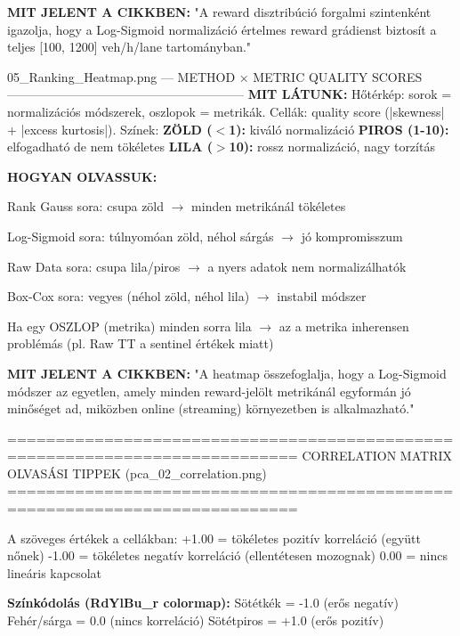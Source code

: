 \documentclass[11pt,a4paper]{article}
\begin{document}
\textbf{MIT JELENT A CIKKBEN:}
"A reward disztribúció forgalmi szintenként igazolja, hogy a
Log-Sigmoid normalizáció értelmes reward grádienst biztosít
a teljes [100, 1200] veh/h/lane tartományban."

05\_Ranking\_Heatmap.png — METHOD × METRIC QUALITY SCORES
---------------------------------------------------------
\textbf{MIT LÁTUNK:}
Hőtérkép: sorok = normalizációs módszerek, oszlopok = metrikák.
Cellák: quality score (|skewness| + |excess kurtosis|).
Színek:
\textbf{ZÖLD ($<$1):} kiváló normalizáció
\textbf{PIROS (1-10):} elfogadható de nem tökéletes
\textbf{LILA ($>$10):} rossz normalizáció, nagy torzítás

\textbf{HOGYAN OLVASSUK:}
\par\noindent\hspace*{1em}\textbullet{} Rank Gauss sora: csupa zöld $\rightarrow$ minden metrikánál tökéletes
\par\noindent\hspace*{1em}\textbullet{} Log-Sigmoid sora: túlnyomóan zöld, néhol sárgás $\rightarrow$ jó kompromisszum
\par\noindent\hspace*{1em}\textbullet{} Raw Data sora: csupa lila/piros $\rightarrow$ a nyers adatok nem normalizálhatók
\par\noindent\hspace*{1em}\textbullet{} Box-Cox sora: vegyes (néhol zöld, néhol lila) $\rightarrow$ instabil módszer
\par\noindent\hspace*{1em}\textbullet{} Ha egy OSZLOP (metrika) minden sorra lila $\rightarrow$ az a metrika
inherensen problémás (pl. Raw TT a sentinel értékek miatt)

\textbf{MIT JELENT A CIKKBEN:}
"A heatmap összefoglalja, hogy a Log-Sigmoid módszer az egyetlen,
amely minden reward-jelölt metrikánál egyformán jó minőséget ad,
miközben online (streaming) környezetben is alkalmazható."

============================================================================
CORRELATION MATRIX OLVASÁSI TIPPEK (pca\_02\_correlation.png)
============================================================================

A szöveges értékek a cellákban:
+1.00 = tökéletes pozitív korreláció (együtt nőnek)
-1.00 = tökéletes negatív korreláció (ellentétesen mozognak)
0.00 = nincs lineáris kapcsolat

\textbf{Színkódolás (RdYlBu\_r colormap):}
Sötétkék = -1.0 (erős negatív)
Fehér/sárga = 0.0 (nincs korreláció)
Sötétpiros = +1.0 (erős pozitív)
\end{document}
